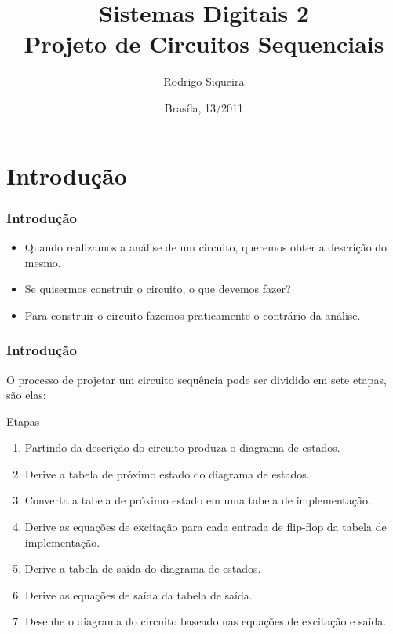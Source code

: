 \documentclass{beamer}
\title{Sistemas Digitais 2\\ \textbf{Projeto de Circuitos Sequenciais}}
\author{Rodrigo Siqueira}
\date{Brasíla, 13/2011}
\institute{\textbf{Universidade de Brasília - Faculdade do Gama}}
\begin{document}
\begin{frame}
  \titlepage
\end{frame}
  
\section{Introdução}
\begin{frame}
  \frametitle{Introdução}
  \begin{itemize}
   \item Quando realizamos a análise de um circuito, queremos obter a descrição do mesmo. \pause
   \item Se quisermos construir o circuito, o que devemos fazer? \pause
   \item Para construir o circuito fazemos praticamente o contrário da análise.
  \end{itemize}
\end{frame}

\begin{frame}
 \frametitle{Introdução}
 O processo de projetar um circuito sequência pode ser dividido em sete etapas, são elas:
 \begin{block}{Etapas}
  \begin{enumerate}
   \item Partindo da descrição do circuito produza o diagrama de estados.\pause
   \item Derive a tabela de próximo estado do diagrama de estados.\pause
   \item Converta a tabela de próximo estado em uma tabela de implementação.\pause
   \item Derive as equações de excitação para cada entrada de flip-flop da tabela de implementação.\pause
   \item Derive a tabela de saída do diagrama de estados.\pause
   \item Derive as equações de saída da tabela de saída. \pause
   \item Desenhe o diagrama do circuito baseado nas equações de excitação e saída.
  \end{enumerate}

 \end{block}

\end{frame}


\end{document}

